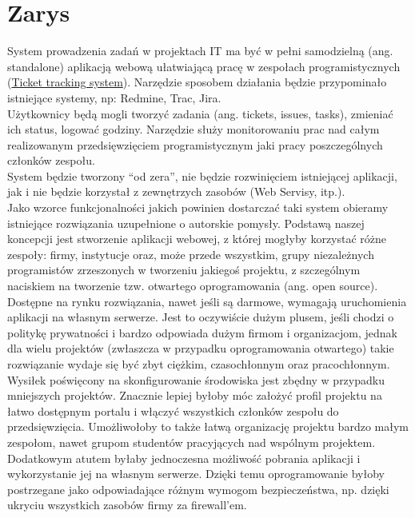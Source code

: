 \documentclass[a4paper,12pt,notitlepage]{mwrep}
\begin{document}
\section{Zarys}
System prowadzenia zadań w projektach IT ma być w pełni samodzielną (ang. standalone)
aplikacją webową ułatwiającą pracę w zespołach programistycznych (\href{http://en.wikipedia.org/wiki/Issue_tracking_system}{Ticket tracking system}).
Narzędzie sposobem działania będzie przypominało istniejące systemy, np: Redmine, Trac, Jira.\\
Użytkownicy będą mogli tworzyć zadania (ang. tickets, issues, tasks), zmieniać ich status, logować godziny.
Narzędzie służy monitorowaniu prac nad całym realizowanym przedsięwzięciem programistycznym jaki pracy poszczególnych członków zespołu.\\
System będzie tworzony “od zera”, nie będzie rozwinięciem istniejącej aplikacji,
jak i nie będzie korzystał z zewnętrzych zasobów (Web Servisy, itp.).\\	
Jako wzorce funkcjonalności jakich powinien dostarczać taki system obieramy
istniejące rozwiązania uzupełnione o autorskie pomysły.
Podstawą naszej koncepcji jest stworzenie aplikacji webowej, z której mogłyby korzystać różne zespoły:
firmy, instytucje oraz, może przede wszystkim, grupy niezależnych programistów zrzeszonych
w tworzeniu jakiegoś projektu, z szczególnym naciskiem na tworzenie tzw. otwartego oprogramowania
(ang. open source). Dostępne na rynku rozwiązania, nawet jeśli są darmowe, wymagają uruchomienia
aplikacji na własnym serwerze. Jest to oczywiście dużym plusem, jeśli chodzi o politykę prywatności
i bardzo odpowiada dużym firmom i organizacjom, jednak dla wielu projektów
(zwłaszcza w przypadku oprogramowania otwartego) takie rozwiązanie wydaje się być zbyt ciężkim,
czasochłonnym oraz pracochłonnym. Wysiłek poświęcony na skonfigurowanie środowiska jest zbędny
w przypadku mniejszych projektów. Znacznie lepiej byłoby móc założyć profil projektu na łatwo
dostępnym portalu i włączyć wszystkich członków zespołu do przedsięwzięcia. Umożliwołoby to także
łatwą organizację projektu bardzo małym zespołom, nawet grupom studentów pracyjących nad wspólnym projektem.\\
Dodatkowym atutem byłaby jednoczesna możliwość pobrania aplikacji i wykorzystanie jej na własnym serwerze.
Dzięki temu oprogramowanie byłoby postrzegane jako odpowiadające różnym wymogom bezpieczeństwa,
np. dzięki ukryciu wszystkich zasobów firmy za firewall’em.
\end{document}
